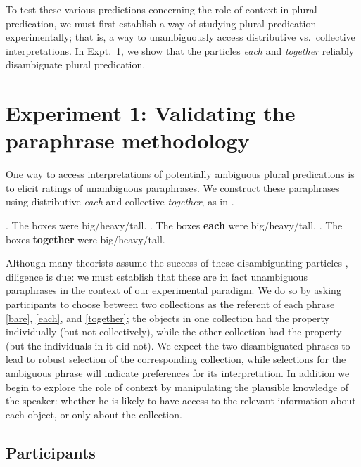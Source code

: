 \documentclass[linguex]{sp}
\begin{document}
To test these various predictions concerning the role of context in plural predication, we must first establish a way of studying plural predication experimentally; that is, a way to unambiguously access distributive vs.~collective interpretations. In Expt.~1, we show that the particles \emph{each} and \emph{together} reliably disambiguate plural predication. %

\section{Experiment 1: Validating the paraphrase methodology}

One way to access interpretations of potentially ambiguous plural predications is to elicit ratings of unambiguous paraphrases. We construct these paraphrases using distributive \emph{each} and collective \emph{together}, as in \Next.

\ex. \label{bare}The boxes were big/heavy/tall.
\a.\label{each} The boxes \textbf{each} were big/heavy/tall.
\b.\label{together} The boxes \textbf{together} were big/heavy/tall.

Although many theorists assume the success of these disambiguating particles \citep[e.g.,][]{schwarzschild1994}, diligence is due: we must establish that these are in fact unambiguous paraphrases in the context of our experimental paradigm. We do so by asking participants to choose between two collections as the referent of each phrase \ref{bare}, \ref{each}, and \ref{together}; the objects in one collection had the property individually (but not collectively), while the other collection had the property (but the individuals in it did not).
We expect the two disambiguated phrases to lead to robust selection of the corresponding collection, while selections for the ambiguous phrase will indicate preferences for its interpretation.
In addition we begin to explore the role of context by manipulating the plausible knowledge of the speaker: whether he is likely to have access to the relevant information about each object, or only about the collection.

\subsection{Participants}
\end{document}
